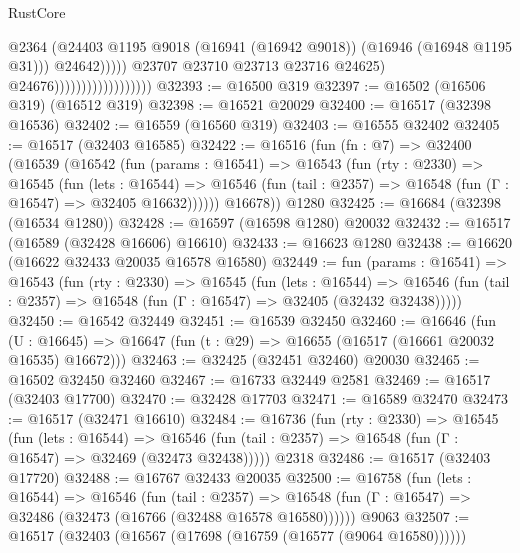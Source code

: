 \begin{lexlean}{RustCore}
\begin{coremodule}
                                                    @2364
                                                    (@24403
                                                      @1195
                                                      @9018
                                                      (@16941 (@16942 @9018))
                                                      (@16946 (@16948 @1195 @31)))
                                                    @24642)))))
                                          @23707
                                          @23710
                                          @23713
                                          @23716
                                          @24625)
                                        @24676))))))))))))))))))
@32393 := @16500 @319
@32397 := @16502 (@16506 @319) (@16512 @319)
@32398 := @16521 @20029
@32400 := @16517 (@32398 @16536)
@32402 := @16559 (@16560 @319)
@32403 := @16555 @32402
@32405 := @16517 (@32403 @16585)
@32422 := @16516
    (fun (fn : @7) =>
    @32400
      (@16539
        (@16542
          (fun (params : @16541) =>
          @16543
            (fun (rty : @2330) =>
            @16545
              (fun (lets : @16544) =>
              @16546 (fun (tail : @2357) => @16548 (fun (Γ : @16547) => @32405 @16632))))))
        @16678))
    @1280
@32425 := @16684 (@32398 (@16534 @1280))
@32428 := @16597 (@16598 @1280) @20032
@32432 := @16517 (@16589 (@32428 @16606) @16610)
@32433 := @16623 @1280
@32438 := @16620 (@16622 @32433 @20035 @16578 @16580)
@32449 := fun (params : @16541) =>
  @16543
    (fun (rty : @2330) =>
    @16545
      (fun (lets : @16544) =>
      @16546 (fun (tail : @2357) => @16548 (fun (Γ : @16547) => @32405 (@32432 @32438)))))
@32450 := @16542 @32449
@32451 := @16539 @32450
@32460 := @16646
    (fun (U : @16645) => @16647 (fun (t : @29) => @16655 (@16517 (@16661 @20032 @16535) @16672)))
@32463 := @32425 (@32451 @32460) @20030
@32465 := @16502 @32450 @32460
@32467 := @16733 @32449 @2581
@32469 := @16517 (@32403 @17700)
@32470 := @32428 @17703
@32471 := @16589 @32470
@32473 := @16517 (@32471 @16610)
@32484 := @16736
    (fun (rty : @2330) =>
    @16545
      (fun (lets : @16544) =>
      @16546 (fun (tail : @2357) => @16548 (fun (Γ : @16547) => @32469 (@32473 @32438)))))
    @2318
@32486 := @16517 (@32403 @17720)
@32488 := @16767 @32433 @20035
@32500 := @16758
    (fun (lets : @16544) =>
    @16546
      (fun (tail : @2357) =>
      @16548 (fun (Γ : @16547) => @32486 (@32473 (@16766 (@32488 @16578 @16580))))))
    @9063
@32507 := @16517 (@32403 (@16567 (@17698 (@16759 (@16577 (@9064 @16580))))))

\end{coremodule}
\end{lexlean}
